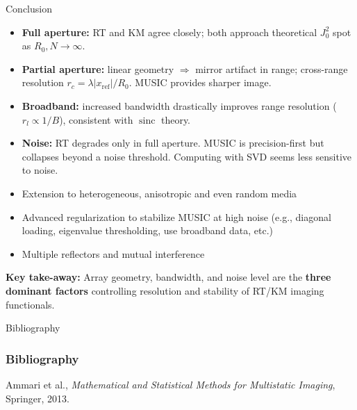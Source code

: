 \documentclass{beamer}
\begin{document}
\begin{frame}{Conclusion}
  \scriptsize
  \vspace{-0.1cm}
  \begin{tcolorbox}[keybox, title=Summary of Findings, top=2pt, bottom=2pt]
    \begin{itemize}[leftmargin=0.5em, label=\textbullet]\setlength\itemsep{1.5pt}
      \item \textbf{Full aperture:} RT and KM agree closely; both approach theoretical $J_0^2$ spot as $R_0,N\!\to\!\infty$.
      \item \textbf{Partial aperture:} linear geometry $\Rightarrow$ mirror artifact in range; cross-range resolution $r_c\!=\!\lambda|x_{\mathrm{ref}}|/R_0$. MUSIC provides sharper image.
      \item \textbf{Broadband:} increased bandwidth drastically improves range resolution ($r_l \!\propto\! 1/B$), consistent with $\operatorname{sinc}$ theory.
      \item \textbf{Noise:} RT degrades only in full aperture. MUSIC is precision-first but collapses beyond a noise threshold. Computing with SVD seems less sensitive to noise.
    \end{itemize} 
  \end{tcolorbox}
 

  \begin{tcolorbox}[warnbox, title=Perspectives, top=2pt, bottom=2pt]
    \begin{itemize}[leftmargin=0.5em, label=\textbullet]\setlength\itemsep{1.5pt}
      \item Extension to heterogeneous, anisotropic and even random media
      \item Advanced regularization to stabilize MUSIC at high noise (e.g., diagonal loading, eigenvalue thresholding, use broadband data, etc.)
      \item Multiple reflectors and mutual interference
    \end{itemize}
  \end{tcolorbox}


  \begin{tcolorbox}[keybox, top=2pt, bottom=2pt]
    \textbf{Key take-away:} Array geometry, bandwidth, and noise level are the \textbf{three dominant factors} controlling resolution and stability of RT/KM imaging functionals.
  \end{tcolorbox}
\end{frame}


\begingroup
{}

\begin{frame}[allowframebreaks]{Bibliography}
\frametitle{Bibliography}
Ammari et al., \textit{Mathematical and Statistical Methods for Multistatic Imaging}, Springer, 2013.
\end{frame}
\endgroup
\end{document}
